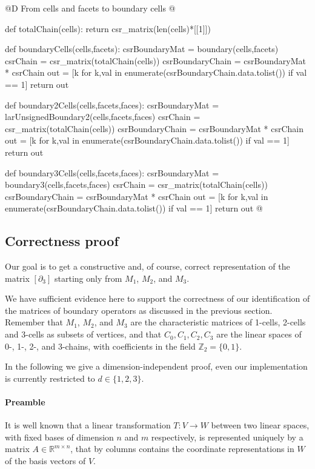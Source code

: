 \documentclass[11pt,oneside]{article}	%
\def\R{\mathbb{R}}
\def\Z{\mathbb{Z}}
\begin{document}
@D From cells and facets to boundary cells
@{def totalChain(cells):
    return csr_matrix(len(cells)*[[1]])

def boundaryCells(cells,facets):
    csrBoundaryMat = boundary(cells,facets)
    csrChain = csr_matrix(totalChain(cells))
    csrBoundaryChain = csrBoundaryMat * csrChain
    out = [k for k,val in enumerate(csrBoundaryChain.data.tolist()) if val == 1]
    return out

def boundary2Cells(cells,facets,faces):
    csrBoundaryMat = larUnsignedBoundary2(cells,facets,faces)
    csrChain = csr_matrix(totalChain(cells))
    csrBoundaryChain = csrBoundaryMat * csrChain
    out = [k for k,val in enumerate(csrBoundaryChain.data.tolist()) if val == 1]
    return out

def boundary3Cells(cells,facets,faces):
    csrBoundaryMat = boundary3(cells,facets,faces)
    csrChain = csr_matrix(totalChain(cells))
    csrBoundaryChain = csrBoundaryMat * csrChain
    out = [k for k,val in enumerate(csrBoundaryChain.data.tolist()) if val == 1]
    return out
@}


\subsection{Correctness proof}

Our goal is to get a constructive and, of course, correct representation of the matrix $[\partial_3]$ starting only from $M_1$, $M_2$, and $M_3$.

We have sufficient evidence here to support the correctness of our identification of the matrices of boundary operators as discussed in the previous section. Remember that $M_1$, $M_2$, and $M_3$ are the characteristic matrices of 1-cells, 2-cells and 3-cells as subsets of vertices, and that $C_0, C_1, C_2, C_3$ are the linear spaces of 0-, 1-, 2-, and 3-chains, with coefficients in the field $\Z_2=\{0,1\}$.

In the following we give a dimension-independent proof, even our implementation is currently restricted to $d\in\{1,2,3\}$.

\paragraph{Preamble}
It is well known that a linear transformation $T: V\to W$ between two linear spaces, with fixed bases  of dimension $n$ and $m$ respectively, is represented uniquely by a matrix $A\in \R^{m\times n}$, that by columns contains the coordinate representations in $W$ of the basis vectors of $V$. 
\end{document}
